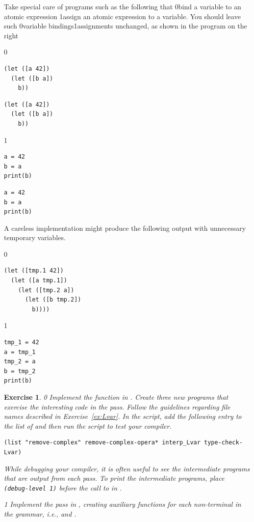 \documentclass[7x10]{TimesAPriori_MIT}%
\def\racketEd{0}
\def\pythonEd{1}
\def\edition{1}
\newcommand{\racket}[1]{{\if\edition\racketEd{#1}\fi}}
\newcommand{\python}[1]{{\if\edition\pythonEd #1\fi}}
\newtheorem{exercise}[theorem]{Exercise}
\begin{document}
Take special care of programs such as the following that
%
\racket{bind a variable to an atomic expression}
%
\python{assign an atomic expression to a variable}.
%
You should leave such \racket{variable bindings}\python{assignments}
unchanged, as shown in the program on the right\\
%
{\if\edition\racketEd
\begin{transformation}
\begin{lstlisting}
(let ([a 42])
  (let ([b a])
    b))
\end{lstlisting}
\compilesto
\begin{lstlisting}
(let ([a 42])
  (let ([b a])
    b))
\end{lstlisting}
\end{transformation}
\fi}
{\if\edition\pythonEd
\begin{transformation}
\begin{lstlisting}
a = 42
b = a
print(b)
\end{lstlisting}
\compilesto
\begin{lstlisting}
a = 42
b = a
print(b)
\end{lstlisting}
\end{transformation}
\fi}
%
\noindent A careless implementation might produce the following output with
unnecessary temporary variables.
\begin{center}
\begin{minipage}{0.4\textwidth}
{\if\edition\racketEd
\begin{lstlisting}
(let ([tmp.1 42])
  (let ([a tmp.1])
    (let ([tmp.2 a])
      (let ([b tmp.2])
        b))))
\end{lstlisting}
\fi}
{\if\edition\pythonEd
\begin{lstlisting}
tmp_1 = 42
a = tmp_1
tmp_2 = a
b = tmp_2
print(b)
\end{lstlisting}
\fi}
\end{minipage}
\end{center}

\begin{exercise}
  \normalfont
{\if\edition\racketEd  
Implement the  function in
.
%
Create three new \LangVar{} programs that exercise the interesting
code in the  pass.  Follow the guidelines
regarding file names described in Exercise~\ref{ex:Lvar}.
%
In the  script, add the following entry to the
list of  and then run the script to test your compiler.
\begin{lstlisting}
(list "remove-complex" remove-complex-opera* interp_Lvar type-check-Lvar)
\end{lstlisting}
While debugging your compiler, it is often useful to see the
intermediate programs that are output from each pass. To print the
intermediate programs, place \lstinline{(debug-level 1)} before the call to
 in .
\fi}
%
{\if\edition\pythonEd
  Implement the  pass in
  , creating auxiliary functions for each
  non-terminal in the grammar, i.e., 
  and .
\fi}  
\end{exercise}
\end{document}
